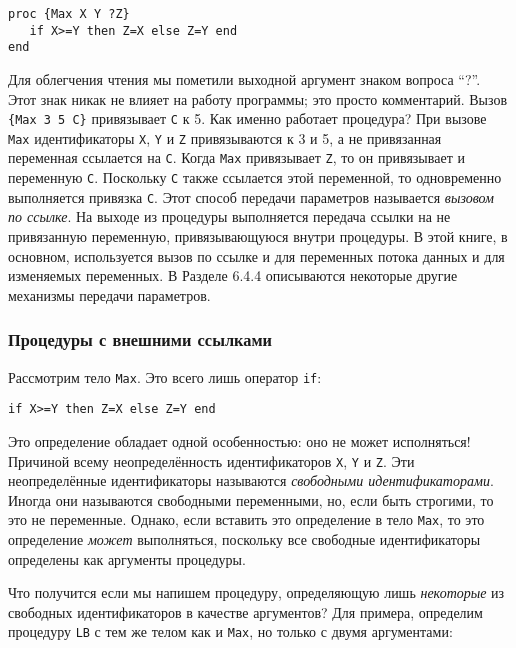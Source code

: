 \begin{lstlisting}
proc {Max X Y ?Z}
   if X>=Y then Z=X else Z=Y end
end
\end{lstlisting}

Для облегчения чтения мы пометили выходной аргумент знаком вопроса ``?''. Этот знак никак не влияет на работу программы; это просто комментарий. Вызов \lstinline|{Max 3 5 C}| привязывает \lstinline|C| к 5. Как именно работает процедура? При вызове \lstinline|Max| идентификаторы \lstinline|X|, \lstinline|Y| и \lstinline|Z| привязываются к 3 и 5, а не привязанная переменная ссылается на \lstinline|C|. Когда \lstinline|Max| привязывает \lstinline|Z|, то он привязывает и переменную \lstinline|C|. Поскольку \lstinline|C| также ссылается этой переменной, то одновременно выполняется привязка \lstinline|C|. Этот способ передачи параметров называется \emph{вызовом по ссылке}. На выходе из процедуры выполняется передача ссылки на не привязанную переменную, привязывающуюся внутри процедуры. В этой книге, в основном, используется вызов по ссылке и для переменных потока данных и для изменяемых переменных. В Разделе 6.4.4 описываются некоторые другие механизмы передачи параметров.

\subsubsection{Процедуры с внешними ссылками}

Рассмотрим тело \lstinline|Max|. Это всего лишь оператор \lstinline|if|:

\begin{lstlisting}
if X>=Y then Z=X else Z=Y end
\end{lstlisting}

Это определение обладает одной особенностью: оно не может исполняться! Причиной всему неопределённость идентификаторов \lstinline|X|, \lstinline|Y| и \lstinline|Z|. Эти неопределённые идентификаторы называются \emph{свободными идентификаторами}. Иногда они называются свободными переменными, но, если быть строгими, то это не переменные. Однако, если вставить это определение в тело \lstinline|Max|, то это определение \emph{может} выполняться, поскольку все свободные идентификаторы определены как аргументы процедуры.

Что получится если мы напишем процедуру, определяющую лишь \emph{некоторые} из свободных идентификаторов в качестве аргументов? Для примера, определим процедуру \lstinline|LB| с тем же телом как и \lstinline|Max|, но только с двумя аргументами:

